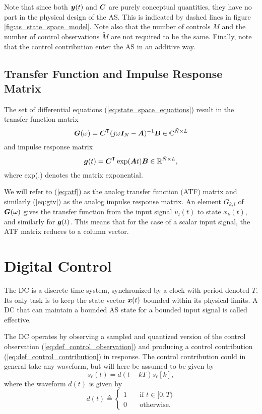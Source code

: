 Note that since both $\bm{y}(t)$ and $\bm{C}$ are purely conceptual quantities, they have no part in the physical design of the AS. This is indicated by dashed lines in figure \ref{fig:as_state_space_model}. Note also that the number of controls $M$ and the number of control observations $\tilde{M}$ are not required to be the same. Finally, note that the control contribution enter the AS in an additive way.

\subsection{Transfer Function and Impulse Response Matrix}
The set of differential equations (\ref{eq:state_space_equations}) result in the transfer function matrix
\begin{equation}
    \label{eq:atf}
    \bm{G}(\omega) = \bm{C}^\mathsf{T} (j\omega \bm{I}_N - \bm{A})^{-1} \bm{B} \in \mathbb{C}^{\tilde{N} \times L}
\end{equation}
and impulse response matrix
\begin{equation}
    \label{eq:gtv}
    \bm{g}(t) = \bm{C}^\mathsf{T} \exp(\bm{A} t)\bm{B} \in \mathbb{R}^{\tilde{N} \times L},
\end{equation}
where exp(.) denotes the matrix exponential.

We will refer to (\ref{eq:atf}) as the analog transfer function (ATF) matrix and similarly (\ref{eq:gtv}) as the analog impulse response matrix. An element $G_{k,l}$ of $\bm{G}(\omega)$ gives the transfer function from the input signal $u_l(t)$ to state $x_k(t)$, and similarly for $\bm{g}(t)$. This means that for the case of a scalar input signal, the ATF matrix reduces to a column vector.

\section{Digital Control}
The DC is a discrete time system, synchronized by a clock with period denoted $T$. Its only task is to keep the state vector $\bm{x}(t)$ bounded within its physical limits. A DC that can maintain a bounded AS state for a bounded input signal is called effective.

The DC operates by observing a sampled and quantized version of the control observation (\ref{eq:def_control_observation}) and producing a control contribution (\ref{eq:def_control_contribution}) in response. The control contribution could in general take any waveform, but will here be assumed to be given by
\begin{equation}
    \label{eq:control_contribution_waveform}
    s_\ell(t) = d(t-kT)s_\ell[k],
\end{equation}
where the waveform $d(t)$ is given by
\begin{equation}
    \label{eq:def_dac_waveform}
    d(t) \triangleq
    \begin{cases}
        1 &\quad \text{if } t \in [0, T) \\
        0 &\quad \text{otherwise}.
    \end{cases}
\end{equation}

